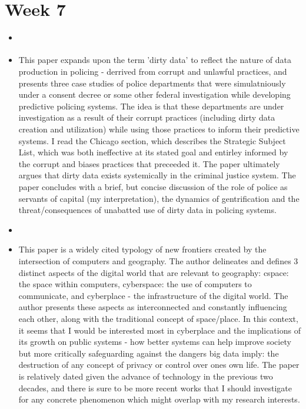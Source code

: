 \documentclass{article} \usepackage{filecontents}
\begin{document}
\section{Week 7}
\begin{itemize}
  
\item \cite{richardson2019DirtyData}
\item This paper expands upon the term 'dirty data' to reflect the
  nature of data production in policing - derrived from corrupt and
  unlawful practices, and presents three case studies of police
  departments that were simulatniously under a consent decree or some
  other federal investigation while developing predictive policing
  systems. The idea is that these departments are under investigation
  as a result of their corrupt practices (including dirty data
  creation and utilization) while using those practices to inform
  their predictive systems. I read the Chicago section, which
  describes the Strategic Subject List, which was both ineffective at
  its stated goal and entirley informed by the corrupt and biases
  practices that preceeded it. The paper ultimately argues that dirty
  data exists systemically in the criminal justice system. The paper
  concludes with a brief, but concise discussion of the role of police
  as servants of capital (my interpretation), the dynamics of
  gentrification and the threat/consequences of unabatted use of dirty
  data in policing systems.


\item \cite{batty1997VirtualGeographya}
\item This paper is a widely cited typology of new frontiers created
  by the intersection of computers and geography. The author
  delineates and defines 3 distinct aspects of the digital world that
  are relevant to geography: cspace: the space within computers,
  cyberspace: the use of computers to communicate, and cyberplace -
  the infrastructure of the digital world. The author presents these
  aspects as interconnected and constantly influencing each other,
  along with the traditional concept of space/place. In this context,
  it seems that I would be interested most in cyberplace and the
  implications of its growth on public systems - how better systems
  can help improve society but more critically safeguarding against
  the dangers big data imply: the destruction of any concept of
  privacy or control over ones own life. The paper is relatively dated
  given the advance of technology in the previous two decades, and
  there is sure to be more recent works that I should investigate for
  any concrete phenomenon which might overlap with my research
  interests.
\end{itemize}
\end{document}
